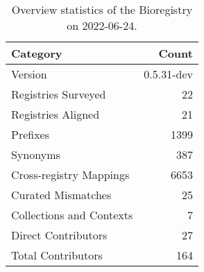 \begin{table}
\centering
\caption{Overview statistics of the Bioregistry on 2022-06-24.}
\label{tab:bioregistry-summary}
\begin{tabular}{lr}
\toprule
                Category &      Count \\
\midrule
                 Version & 0.5.31-dev \\
     Registries Surveyed &         22 \\
      Registries Aligned &         21 \\
                Prefixes &       1399 \\
                Synonyms &        387 \\
 Cross-registry Mappings &       6653 \\
      Curated Mismatches &         25 \\
Collections and Contexts &          7 \\
     Direct Contributors &         27 \\
      Total Contributors &        164 \\
\bottomrule
\end{tabular}
\end{table}
